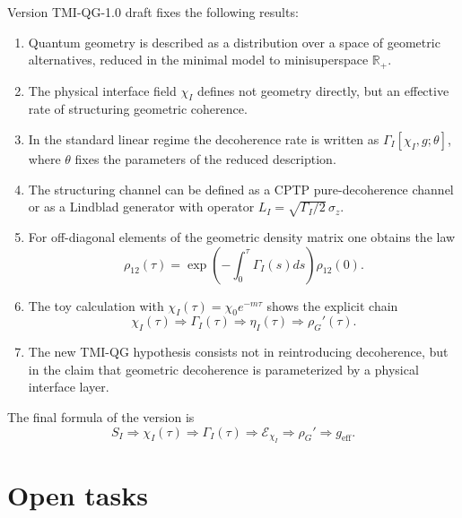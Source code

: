 \documentclass[12pt,a4paper]{article}
\newcommand{\Eff}{\mathrm{eff}}
\begin{document}
Version TMI-QG-1.0 draft fixes the following results:
\begin{enumerate}[leftmargin=2em]
    \item Quantum geometry is described as a distribution over a space of geometric alternatives, reduced in the minimal model to minisuperspace $\mathbb R_+$.
    \item The physical interface field $\chi_I$ defines not geometry directly, but an effective rate of structuring geometric coherence.
    \item In the standard linear regime the decoherence rate is written as $\Gamma_I[\chi_I,g;\theta]$, where $\theta$ fixes the parameters of the reduced description.
    \item The structuring channel can be defined as a CPTP pure-decoherence channel or as a Lindblad generator with operator $L_I=\sqrt{\Gamma_I/2}\,\sigma_z$.
    \item For off-diagonal elements of the geometric density matrix one obtains the law
    \[
    \rho_{12}(\tau)
    =
    \exp\left(-\int_0^\tau\Gamma_I(s)ds\right)\rho_{12}(0).
    \]
    \item The toy calculation with $\chi_I(\tau)=\chi_0e^{-m\tau}$ shows the explicit chain
    \[
    \chi_I(\tau)
    \Rightarrow
    \Gamma_I(\tau)
    \Rightarrow
    \eta_I(\tau)
    \Rightarrow
    \rho_G'(\tau).
    \]
    \item The new TMI-QG hypothesis consists not in reintroducing decoherence, but in the claim that geometric decoherence is parameterized by a physical interface layer.
\end{enumerate}

The final formula of the version is
\[
\boxed{
S_I
\Rightarrow
\chi_I(\tau)
\Rightarrow
\Gamma_I(\tau)
\Rightarrow
\mathcal E_{\chi_I}
\Rightarrow
\rho_G'
\Rightarrow
 g_{\Eff}.
}
\]

\section{Open tasks}
\end{document}
